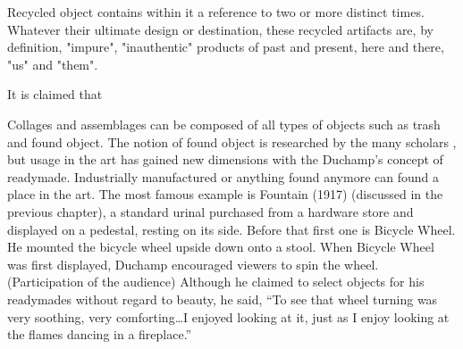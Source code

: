  

Recycled object contains within it a reference to two or more distinct times. Whatever their ultimate design or destination, these recycled artifacts are, by definition, "impure", "inauthentic" products of past and present, here and there, "us" and "them". 

It is claimed that  

Collages and assemblages can be composed of all types of objects such as trash and found object. The notion of found object is researched by the many scholars , but usage in the art has gained new dimensions with the Duchamp's concept of readymade. Industrially manufactured or anything found  anymore can found a place in the art. The most famous example is Fountain (1917) (discussed in the previous chapter), a standard urinal purchased from a hardware store and displayed on a pedestal, resting on its side. Before that first one is Bicycle Wheel. He mounted the bicycle wheel upside down onto a stool. 
When Bicycle Wheel was first displayed, Duchamp encouraged viewers to spin the wheel. (Participation of the audience) Although he claimed to select objects for his readymades without regard to beauty, he said, “To see that wheel turning was very soothing, very comforting\ldots I enjoyed looking at it, just as I enjoy looking at the flames dancing in a fireplace.”

